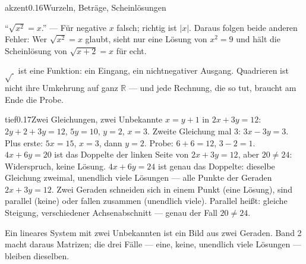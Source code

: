 \begin{loesungkarte}{akzent}{0.16}{Wurzeln, Beträge, Scheinlösungen}
\begin{fehler}\kastentext
\enquote{$\sqrt{x^{2}} = x$.} --- Für negative $x$ falsch; richtig ist $|x|$. Daraus folgen beide anderen Fehler: Wer $\sqrt{x^{2}} = x$ glaubt, sieht nur eine Lösung von $x^{2} = 9$ und hält die Scheinlösung von $\sqrt{x + 2} = x$ für echt.
\end{fehler}
\begin{mitnehmen}\kastentext
$\sqrt{\ }$ ist eine Funktion: ein Eingang, ein nichtnegativer Ausgang. Quadrieren ist nicht ihre Umkehrung auf ganz $\mathbb R$ --- und jede Rechnung, die so tut, braucht am Ende die Probe.
\end{mitnehmen}
\end{loesungkarte}

\begin{loesungkarte}{tief}{0.17}{Zwei Gleichungen, zwei Unbekannte}
$x = y + 1$ in $2x + 3y = 12$: $2y + 2 + 3y = 12$, $5y = 10$, $y = 2$, $x = 3$.
Zweite Gleichung mal $3$: $3x - 3y = 3$. Plus erste: $5x = 15$, $x = 3$, dann $y = 2$. Probe: $6 + 6 = 12$, $3 - 2 = 1$. \checkmark
{}
$4x + 6y = 20$ ist das Doppelte der linken Seite von $2x + 3y = 12$, aber $20\neq24$: Widerspruch, keine Lösung. $4x + 6y = 24$ ist genau das Doppelte: dieselbe Gleichung zweimal, unendlich viele Lösungen --- alle Punkte der Geraden $2x + 3y = 12$.
Zwei Geraden schneiden sich in einem Punkt (eine Lösung), sind parallel (keine) oder fallen zusammen (unendlich viele). Parallel heißt: gleiche Steigung, verschiedener Achsenabschnitt --- genau der Fall $20\neq24$.
\begin{center}
\end{center}
\begin{mitnehmen}\kastentext
Ein lineares System mit zwei Unbekannten ist ein Bild aus zwei Geraden. Band 2 macht daraus Matrizen; die drei Fälle --- eine, keine, unendlich viele Lösungen --- bleiben dieselben.
\end{mitnehmen}
\end{loesungkarte}

